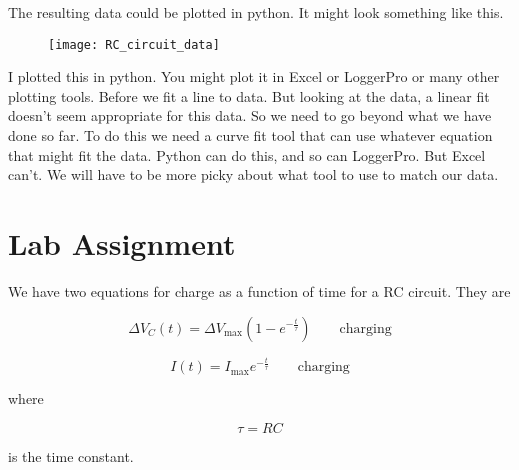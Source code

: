 The resulting data could be plotted in python. It might look something like this.

\begin{figure}[h!]
	\centering
	\texttt{[image: RC\_circuit\_data]}
\end{figure}

I plotted this in python. You might plot it in Excel or LoggerPro  or many other plotting tools. Before we fit a line to data. But looking at the data, a linear fit doesn't seem appropriate for this data. So we need to go beyond what we have done so far. To do this we need a curve fit tool that can use whatever equation that might fit the data. Python can do this, and so can LoggerPro.  But Excel can't. We will have to be more picky about what tool to use to match our data. 

%	

	
\vspace*{\fill}
\pagebreak

\section{Lab Assignment}

We have two equations for charge as a function of time for a RC circuit. They are

\begin{equation*}
	\Delta V_{C}\left( t\right) =\Delta V_{\max }\left( 1-e^{-\frac{t}{\tau }}\right) \qquad \text{charging}
\end{equation*}

\begin{equation*}
	I\left( t\right) =I_{\max }e^{-\frac{t}{\tau }}\qquad \text{charging}
\end{equation*}

\noindent where 

\begin{equation}
	\tau =RC
\end{equation}

\noindent is the time constant.

